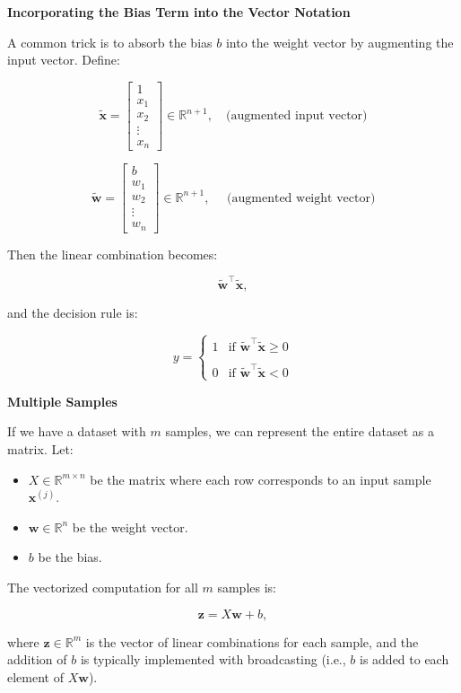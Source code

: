 \documentclass[11pt]{article}
\providecommand{\tightlist}{%
      \setlength{\itemsep}{0pt}\setlength{\parskip}{0pt}}
\begin{document}
\textbf{Incorporating the Bias Term into the Vector Notation}

A common trick is to absorb the bias $b$ into the weight vector by
augmenting the input vector. Define:

$$\tilde{\mathbf{x}} = \begin{bmatrix} 1 \\ x_1 \\ x_2 \\ \vdots \\ x_n \end{bmatrix} \in \mathbb{R}^{n+1}, \quad \text{(augmented input vector)}$$

$$\tilde{\mathbf{w}} = \begin{bmatrix} b \\ w_1 \\ w_2 \\ \vdots \\ w_n \end{bmatrix} \in \mathbb{R}^{n+1}, \quad \text{ (augmented weight vector)}$$

Then the linear combination becomes:

$$
\tilde{\mathbf{w}}^\top \tilde{\mathbf{x}},
$$

and the decision rule is:

$$
y = \begin{cases} 
1 & \text{if } \tilde{\mathbf{w}}^\top \tilde{\mathbf{x}} \geq 0 \\
& \\
0 & \text{if } \tilde{\mathbf{w}}^\top \tilde{\mathbf{x}} < 0
\end{cases}
$$

\textbf{Multiple Samples}

If we have a dataset with $m$ samples, we can represent the entire
dataset as a matrix. Let:

\begin{itemize}
\tightlist
\item
  $X \in \mathbb{R}^{m \times n}$ be the matrix where each row
  corresponds to an input sample $\mathbf{x}^{(j)}$.
\item
  $\mathbf{w} \in \mathbb{R}^{n}$ be the weight vector.
\item
  $b$ be the bias.
\end{itemize}

The vectorized computation for all $m$ samples is:

$$
\mathbf{z} = X \mathbf{w} + b,
$$

where $\mathbf{z} \in \mathbb{R}^{m}$ is the vector of linear
combinations for each sample, and the addition of $b$ is typically
implemented with broadcasting (i.e., $b$ is added to each element of
$X \mathbf{w}$).
\end{document}
